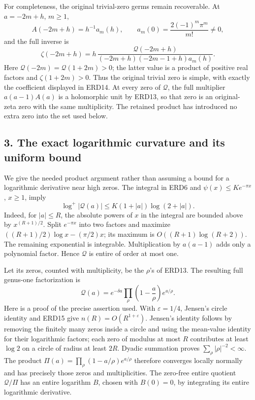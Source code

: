 \documentclass[
  10pt,
  a4paper,
]{article}
\begin{document}
For completeness, the original trivial-zero germs remain recoverable. At
\(a=-2m+h\), \(m\ge1\), \[
 A(-2m+h)=h^{-1}a_m(h),\qquad
 a_m(0)=\frac{2(-1)^m\pi^m}{m!}\ne0,
\] and the full inverse is \[
 \zeta(-2m+h)
    =h\,\frac{\mathcal Q(-2m+h)}
          {(-2m+h)(-2m-1+h)a_m(h)}.
 \tag{ERD14}
\] Here \(\mathcal Q(-2m)=\mathcal Q(1+2m)>0\); the latter value is a
product of positive real factors and \(\zeta(1+2m)>0\). Thus the
original trivial zero is simple, with exactly the coefficient displayed
in ERD14. At every zero of \(\mathcal Q\), the full multiplier
\(a(a-1)A(a)\) is a holomorphic unit by ERD13, so that zero is an
original-zeta zero with the same multiplicity. The retained product has
introduced no extra zero into the set used below.

\subsection{3. The exact logarithmic curvature and its uniform
bound}\label{the-exact-logarithmic-curvature-and-its-uniform-bound}

We give the needed product argument rather than assuming a bound for a
logarithmic derivative near high zeros. The integral in ERD6 and
\(\psi(x)\le K e^{-\pi x}\), \(x\ge1\), imply \[
 \log^+|\mathcal Q(a)|
       \le K(1+|a|)\log(2+|a|).
 \tag{ERD15}
\] Indeed, for \(|a|\le R\), the absolute powers of \(x\) in the
integral are bounded above by \(x^{(R+1)/2}\). Split \(e^{-\pi x}\) into
two factors and maximize \(((R+1)/2)\log x-(\pi/2)x\); its maximum is
\(O((R+1)\log(R+2))\). The remaining exponential is integrable.
Multiplication by \(a(a-1)\) adds only a polynomial factor. Hence
\(\mathcal Q\) is entire of order at most one.

Let its zeros, counted with multiplicity, be the \(\rho\)'s of ERD13.
The resulting full genus-one factorization is \[
 \mathcal Q(a)=e^{-\delta a}
     \prod_\rho \left(1-\frac a\rho\right)e^{a/\rho}.
 \tag{ERD16}
\] Here is a proof of the precise assertion used. With
\(\varepsilon=1/4\), Jensen's circle identity and ERD15 give
\(n(R)=O(R^{1+\varepsilon})\). Jensen's identity follows by removing the
finitely many zeros inside a circle and using the mean-value identity
for their logarithmic factors; each zero of modulus at most \(R\)
contributes at least \(\log2\) on a circle of radius at least \(2R\).
Dyadic summation proves \(\sum_\rho|\rho|^{-2}<\infty\). The product
\(\Pi(a)=\prod_\rho(1-a/\rho)e^{a/\rho}\) therefore converges locally
normally and has precisely those zeros and multiplicities. The zero-free
entire quotient \(\mathcal Q/\Pi\) has an entire logarithm \(B\), chosen
with \(B(0)=0\), by integrating its entire logarithmic derivative.
\end{document}
